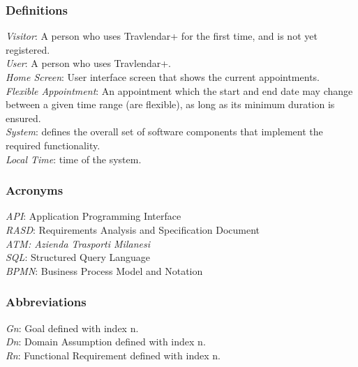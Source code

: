 \documentclass[12pt]{article}
\begin{document}
\subsubsection{Definitions}
\textit{Visitor}: A person who uses Travlendar+ for the first time, and is not yet registered.\\
\textit{User}: A person who uses Travlendar+.\\
\textit{Home Screen}: User interface screen that shows the current appointments.\\
\textit{Flexible Appointment}: An appointment which the start and end date may change between a given time range (are flexible), as long as its minimum duration is ensured.\\
\textit{System}: defines the overall set of software components that implement the required functionality.\\
\textit{Local Time}: time of the system.
\subsubsection{Acronyms}
\textit{API}: Application Programming Interface\\
\textit{RASD}: Requirements Analysis and Specification Document\\
\textit{ATM: Azienda Trasporti Milanesi}\\
\textit{SQL}: Structured Query Language\\
\textit{BPMN}: Business Process Model and Notation
\subsubsection{Abbreviations}
\textit{Gn}: Goal defined with index n.\\
\textit{Dn}: Domain Assumption defined with index n.\\
\textit{Rn}: Functional Requirement defined with index n.
\end{document}
